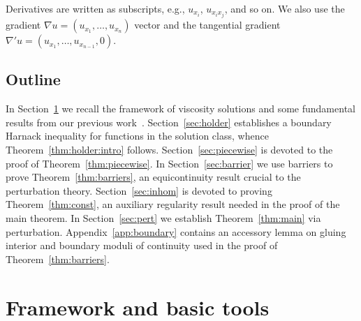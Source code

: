 \documentclass[letter,11pt]{amsart}
\theoremstyle{definition}
\numberwithin{equation}{section}
\begin{document}
\medskip

Derivatives are written as subscripts, e.g., $u_{x_i}$, $u_{x_i x_j}$, and so on.
We also use the gradient $\nabla u = (u_{x_1}, \ldots, u_{x_n})$ vector 
and the tangential gradient $\nabla' u = (u_{x_1}, \ldots, u_{x_{n-1}}, 0)$.

\medskip

\subsection{Outline}
In Section~\ref{sec:visc} we recall the framework of viscosity solutions and some fundamental results from our previous work~\cite{E}.
Section~\ref{sec:holder} establishes a boundary Harnack inequality for functions in the solution class, whence Theorem~\ref{thm:holder:intro} follows.
Section~\ref{sec:piecewise} is devoted to the proof of Theorem~\ref{thm:piecewise}.
In Section~\ref{sec:barrier} we use barriers to prove Theorem~\ref{thm:barriers}, an equicontinuity result crucial to the perturbation theory.
Section~\ref{sec:inhom} is devoted to proving Theorem~\ref{thm:const}, an auxiliary regularity result needed in the proof of the main theorem.
In Section~\ref{sec:pert} we establish Theorem~\ref{thm:main} via perturbation.
Appendix~\ref{app:boundary} contains an accessory lemma on gluing interior and boundary moduli of continuity used in the proof of Theorem~\ref{thm:barriers}.

\medskip


\section{Framework and basic tools}
\label{sec:visc}
\end{document}
